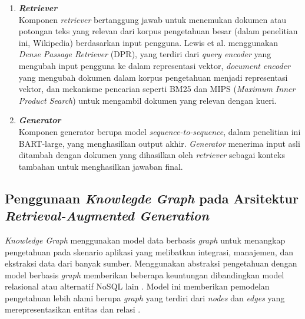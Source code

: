 \begin{enumerate}
	\item \textbf{\textit{Retriever}} \\
	      Komponen \textit{retriever} bertanggung jawab untuk menemukan dokumen atau potongan teks yang relevan dari korpus pengetahuan besar (dalam penelitian ini, Wikipedia) berdasarkan input pengguna.
	      Lewis et al. menggunakan \textit{Dense Passage Retriever} (DPR), yang terdiri dari
	      \textit{query encoder} yang mengubah input pengguna ke dalam representasi vektor,
	      \textit{document encoder} yang mengubah dokumen dalam korpus pengetahuan menjadi representasi vektor, dan
	      mekanisme pencarian seperti BM25 dan MIPS (\textit{Maximum Inner Product Search}) untuk mengambil dokumen yang relevan dengan kueri.
	\item \textbf{\textit{Generator}} \\
	      Komponen generator berupa model \textit{sequence-to-sequence}, dalam penelitian ini BART-large, yang menghasilkan output akhir.
	      \textit{Generator} menerima input asli ditambah dengan dokumen yang dihasilkan oleh \textit{retriever} sebagai konteks tambahan untuk menghasilkan jawaban final.
\end{enumerate}


\subsection{Penggunaan \textit{Knowlegde Graph} pada Arsitektur \textit{Retrieval-Augmented Generation}}
\textit{Knowledge Graph} menggunakan model data berbasis \textit{graph} untuk menangkap pengetahuan pada skenario aplikasi yang melibatkan integrasi, manajemen, dan ekstraksi data dari banyak sumber.
Menggunakan abstraksi pengetahuan dengan model berbasis \textit{graph} memberikan beberapa keuntungan dibandingkan model relasional atau alternatif NoSQL lain \cite{IndustryScaleKnowledgeGraph}.
Model ini memberikan pemodelan pengetahuan lebih alami berupa \textit{graph} yang terdiri dari \textit{nodes} dan \textit{edges} yang merepresentasikan entitas dan relasi \cite{ComparisonofCurrentGraphDatabaseModels}. \\


